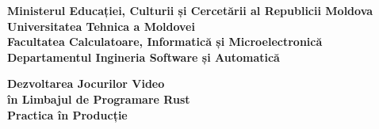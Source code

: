 \begin{titlepage}
    \begin{center}

        \textbf{\large{ Ministerul Educației, Culturii și Cercetării al Republicii Moldova \\ }}
        \textbf{\large{ Universitatea Tehnica a Moldovei \\}}
        \textbf{\large{ Facultatea Calculatoare, Informatică și Microelectronică \\}}
        \textbf{\large{ Departamentul Ingineria Software și Automatică \\}}
        \vspace{6cm}

        {\LARGE {\bf{ Dezvoltarea Jocurilor Video }}}\\
        \vspace{3mm}
        {\LARGE {\bf{ în Limbajul de Programare Rust }}}\\
        \vspace{1cm}
        \textbf{\Large { Practica în Producție \\}}
    \end{center}

    \vfill

    \begin{center}
    \end{center}

    \vfill
\end{titlepage}
